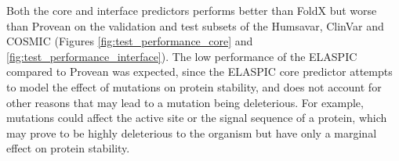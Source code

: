 Both the core and interface predictors performs better than FoldX but worse than Provean on the validation and test subsets of the Humsavar, ClinVar and COSMIC (Figures \ref{fig:test_performance_core} and \ref{fig:test_performance_interface}). The low performance of the ELASPIC compared to Provean was expected, since the ELASPIC core predictor attempts to model the effect of mutations on protein stability, and does not account for other reasons that may lead to a mutation being deleterious. For example, mutations could affect the active site or the signal sequence of a protein, which may prove to be highly deleterious to the organism but have only a marginal effect on protein stability.




\clearpage

